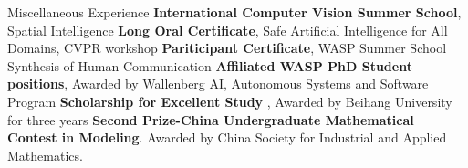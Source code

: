 \begin{rubric}{Miscellaneous Experience}
\entry*[2025, July] \textbf{International Computer Vision Summer School}, Spatial Intelligence
\entry*[2024] \textbf{Long Oral Certificate}, Safe Artificial Intelligence for All Domains, CVPR workshop
\entry*[2023] \textbf{Pariticipant Certificate}, WASP Summer School Synthesis of Human Communication
\entry*[2022] \textbf{Affiliated WASP PhD Student positions}, Awarded by Wallenberg AI, Autonomous Systems and Software Program
\entry*[2016 -- 2019] \textbf{ Scholarship for Excellent Study }, Awarded by Beihang University for three years
\entry*[2017] \textbf{ Second Prize-China Undergraduate Mathematical Contest in Modeling}. Awarded by China Society for Industrial and Applied Mathematics.

\end{rubric}